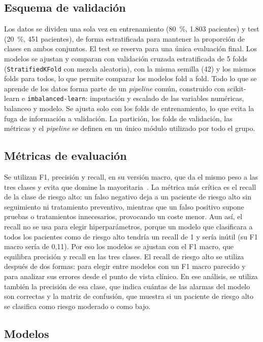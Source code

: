 \documentclass[journal,onecolumn]{IEEEtran}
\begin{document}
\subsection{Esquema de validación}
Los datos se dividen una sola vez en entrenamiento (80~\%, 1.803 pacientes) y test (20~\%, 451
pacientes), de forma estratificada para mantener la proporción de clases en ambos conjuntos.
El test se reserva para una única evaluación final.
Los modelos se ajustan y comparan con validación cruzada estratificada de 5
folds~\cite{tema1,nb_metricas} (\texttt{StratifiedKFold} con mezcla aleatoria), con la misma semilla (42) y
los mismos folds para todos, lo que permite comparar los modelos fold a fold.
Todo lo que se aprende de los datos forma parte de un \textit{pipeline} común, construido con
scikit-learn e \texttt{imbalanced-learn}: imputación y escalado de las variables numéricas, balanceo
y modelo.
Se ajusta solo con los folds de entrenamiento, lo que evita la fuga de información a validación.
La partición, los folds de validación, las métricas y el \textit{pipeline} se definen en un único módulo
utilizado por todo el grupo.

\subsection{Métricas de evaluación}
Se utilizan F1, precisión y recall, en su versión macro, que da el mismo peso a las tres clases y
evita que domine la mayoritaria~\cite{tema1,tema2}.
La métrica más crítica es el recall de la clase de riesgo alto: un falso negativo deja a un paciente
de riesgo alto sin seguimiento ni tratamiento preventivo, mientras que un falso positivo supone
pruebas o tratamientos innecesarios, provocando un coste menor.
Aun así, el recall no se usa para elegir hiperparámetros, porque un modelo que clasificara a todos
los pacientes como de riesgo alto tendría un recall de 1 y sería inútil (su F1 macro sería de 0,11).
Por eso los modelos se ajustan con el F1 macro, que equilibra precisión y recall en las tres clases.
El recall de riesgo alto se utiliza después de dos formas: para elegir entre modelos con un F1 macro
parecido y para analizar sus errores desde el punto de vista clínico.
En ese análisis, se utiliza también la precisión de esa clase, que indica cuántas de las alarmas del
modelo son correctas y la matriz de confusión, que muestra si un paciente de riesgo alto se
clasifica como riesgo moderado o como bajo.

\subsection{Modelos}
\end{document}
